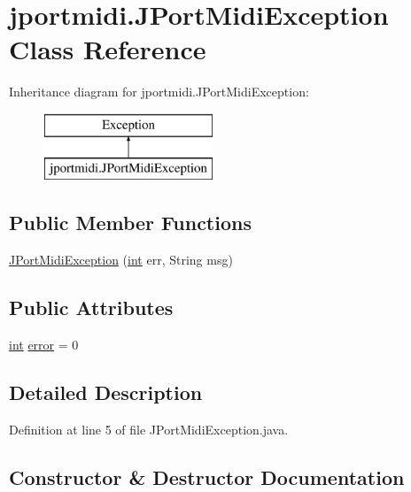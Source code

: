 \hypertarget{classjportmidi_1_1_j_port_midi_exception}{}\section{jportmidi.\+J\+Port\+Midi\+Exception Class Reference}
\label{classjportmidi_1_1_j_port_midi_exception}
Inheritance diagram for jportmidi.\+J\+Port\+Midi\+Exception\+:\begin{figure}[H]
\begin{center}
\leavevmode
\includegraphics[height=2.000000cm]{classjportmidi_1_1_j_port_midi_exception}
\end{center}
\end{figure}
\subsection*{Public Member Functions}
\begin{DoxyCompactItemize}
\item 
\hyperlink{classjportmidi_1_1_j_port_midi_exception_afa5cc01d15db9764166ba7e5db292000}{J\+Port\+Midi\+Exception} (\hyperlink{xmltok_8h_a5a0d4a5641ce434f1d23533f2b2e6653}{int} err, String msg)
\end{DoxyCompactItemize}
\subsection*{Public Attributes}
\begin{DoxyCompactItemize}
\item 
\hyperlink{xmltok_8h_a5a0d4a5641ce434f1d23533f2b2e6653}{int} \hyperlink{classjportmidi_1_1_j_port_midi_exception_a959d03e1180238153cd0fafe4459604b}{error} = 0
\end{DoxyCompactItemize}


\subsection{Detailed Description}


Definition at line 5 of file J\+Port\+Midi\+Exception.\+java.



\subsection{Constructor \& Destructor Documentation}

